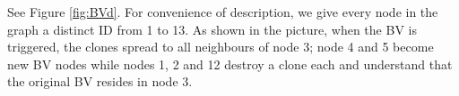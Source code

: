 See Figure \ref{fig:BVd}. For convenience of description, we give every node in the graph a distinct ID from 1 to 13. As shown in the picture, when the BV is triggered, the clones spread to all neighbours of node 3;  node 4 and 5 become new BV nodes while nodes 1, 2 and 12 destroy a clone each and understand  that the original BV resides in node 3. 
%
\begin{figure} [H]
  \centering 
    \hspace{1in} 

\end{figure}
